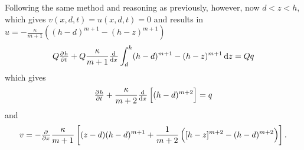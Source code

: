  Following the same method and reasoning as previously, however, now $d < z <h$, which gives $v(x, d, t)= u(x,d,t)= 0$ and results in $u = -\frac{\kappa}{m+1}\left( (h-d)^{m+1} - (h-z)^{m+1} \right)$
%
\begin{equation}
    Q \pd{{h}}{{t}} + Q\frac{\kappa}{m+1}\od{}{{x}}\int_d^h (h-d)^{m+1} - (h - z)^{m+1} \dif{z} = Qq
\end{equation}
which gives
\begin{equation}
    \pd{{h}}{{t}} + \frac{\kappa}{m+2}\od{}{{x}}\left[(h-d)^{m+2}\right] = q
\end{equation}
and
\begin{equation}
    v = - \pd{}{x} \frac{\kappa}{m+1} \left[ (z-d)(h-d)^{m+1} + \frac{1}{m+2} \left( [h-z]^{m+2} - (h-d)^{m+2} \right) \right].
    \label{eq:explicit_v_h}
\end{equation}
